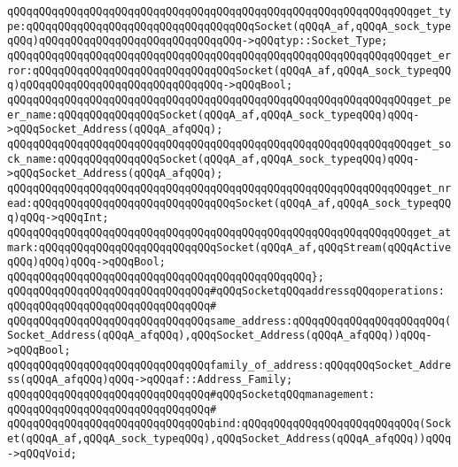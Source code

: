 \verb|qQQqqQQqqQQqqQQqqQQqqQQqqQQqqQQqqQQqqQQqqQQqqQQqqQQqqQQqqQQqqQQqget_type:qQQqqQQqqQQqqQQqqQQqqQQqqQQqqQQqqQQqSocket(qQQqA_af,qQQqA_sock_typeqQQq)qQQqqQQqqQQqqQQqqQQqqQQqqQQqqQQq->qQQqtyp::Socket_Type;|\newline
\verb|qQQqqQQqqQQqqQQqqQQqqQQqqQQqqQQqqQQqqQQqqQQqqQQqqQQqqQQqqQQqqQQqget_error:qQQqqQQqqQQqqQQqqQQqqQQqqQQqqQQqSocket(qQQqA_af,qQQqA_sock_typeqQQq)qQQqqQQqqQQqqQQqqQQqqQQqqQQqqQQq->qQQqBool;|\newline
\newline
\verb|qQQqqQQqqQQqqQQqqQQqqQQqqQQqqQQqqQQqqQQqqQQqqQQqqQQqqQQqqQQqqQQqget_peer_name:qQQqqQQqqQQqqQQqSocket(qQQqA_af,qQQqA_sock_typeqQQq)qQQq->qQQqSocket_Address(qQQqA_afqQQq);|\newline
\verb|qQQqqQQqqQQqqQQqqQQqqQQqqQQqqQQqqQQqqQQqqQQqqQQqqQQqqQQqqQQqqQQqget_sock_name:qQQqqQQqqQQqqQQqSocket(qQQqA_af,qQQqA_sock_typeqQQq)qQQq->qQQqSocket_Address(qQQqA_afqQQq);|\newline
\verb|qQQqqQQqqQQqqQQqqQQqqQQqqQQqqQQqqQQqqQQqqQQqqQQqqQQqqQQqqQQqqQQqget_nread:qQQqqQQqqQQqqQQqqQQqqQQqqQQqqQQqSocket(qQQqA_af,qQQqA_sock_typeqQQq)qQQq->qQQqInt;|\newline
\verb|qQQqqQQqqQQqqQQqqQQqqQQqqQQqqQQqqQQqqQQqqQQqqQQqqQQqqQQqqQQqqQQqget_atmark:qQQqqQQqqQQqqQQqqQQqqQQqqQQqSocket(qQQqA_af,qQQqStream(qQQqActiveqQQq)qQQq)qQQq->qQQqBool;|\newline
\verb|qQQqqQQqqQQqqQQqqQQqqQQqqQQqqQQqqQQqqQQqqQQqqQQq};|\newline
\newline
\verb|qQQqqQQqqQQqqQQqqQQqqQQqqQQqqQQq#qQQqSocketqQQqaddressqQQqoperations:|\newline
\verb|qQQqqQQqqQQqqQQqqQQqqQQqqQQqqQQq#|\newline
\verb|qQQqqQQqqQQqqQQqqQQqqQQqqQQqqQQqsame_address:qQQqqQQqqQQqqQQqqQQqqQQq(Socket_Address(qQQqA_afqQQq),qQQqSocket_Address(qQQqA_afqQQq))qQQq->qQQqBool;|\newline
\verb|qQQqqQQqqQQqqQQqqQQqqQQqqQQqqQQqfamily_of_address:qQQqqQQqSocket_Address(qQQqA_afqQQq)qQQq->qQQqaf::Address_Family;|\newline
\newline
\verb|qQQqqQQqqQQqqQQqqQQqqQQqqQQqqQQq#qQQqSocketqQQqmanagement:|\newline
\verb|qQQqqQQqqQQqqQQqqQQqqQQqqQQqqQQq#|\newline
\verb|qQQqqQQqqQQqqQQqqQQqqQQqqQQqqQQqbind:qQQqqQQqqQQqqQQqqQQqqQQqqQQq(Socket(qQQqA_af,qQQqA_sock_typeqQQq),qQQqSocket_Address(qQQqA_afqQQq))qQQq->qQQqVoid;|\newline

